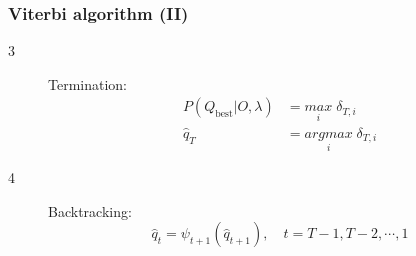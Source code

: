 \documentclass{beamer}
\begin{document}
\begin{frame}
  \frametitle{Viterbi algorithm (II)}
  \begin{description}
  \item[3] Termination: \\
    \begin{equation}
      \label{eq:viterbi-termination}
      \begin{split}
        P(Q_{\text{best}} \vert O, \lambda) & = \underset{i}{max}\; \delta_{T,i} \\
        \hat{q}_T & = \underset{i}{argmax}\; \delta_{T,i}
      \end{split}
    \end{equation}
  \item[4] Backtracking: \\
    \begin{equation}
      \label{eq:viterbi-backtracking}
      \hat{q}_t = \psi_{t+1}(\hat{q}_{t+1}), \quad \scriptstyle{t=T-1,T-2,\cdots, 1}
    \end{equation}
  \end{description}
\end{frame}
\end{document}
